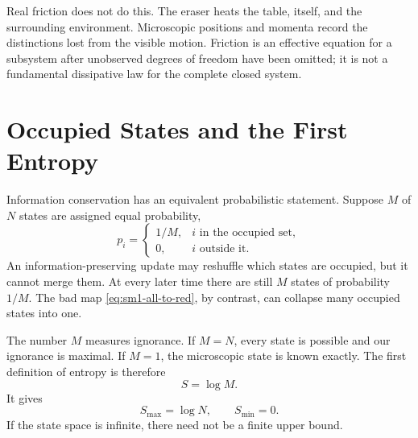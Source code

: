 Real friction does not do this. The eraser heats the table, itself, and the
surrounding environment. Microscopic positions and momenta record the
distinctions lost from the visible motion. Friction is an effective equation
for a subsystem after unobserved degrees of freedom have been omitted; it is
not a fundamental dissipative law for the complete closed system.

\begin{classroomqa}
\end{classroomqa}

\section{Occupied States and the First Entropy}

Information conservation has an equivalent probabilistic statement. Suppose
\(M\) of \(N\) states are assigned equal probability,
\begin{equation}
 p_i=
 \begin{cases}
 1/M, & i\text{ in the occupied set},\\
 0, & i\text{ outside it}.
 \end{cases}
 \label{eq:sm1-uniform-occupied}
\end{equation}
An information-preserving update may reshuffle which states are occupied,
but it cannot merge them. At every later time there are still \(M\) states of
probability \(1/M\). The bad map \eqref{eq:sm1-all-to-red}, by contrast,
can collapse many occupied states into one.

The number \(M\) measures ignorance. If \(M=N\), every state is possible and
our ignorance is maximal. If \(M=1\), the microscopic state is known exactly.
The first definition of entropy is therefore
\begin{equation}
 S=\log M.
 \label{eq:sm1-entropy-logm}
\end{equation}
It gives
\begin{equation}
 S_{\max}=\log N,
 \qquad
 S_{\min}=0.
\end{equation}
If the state space is infinite, there need not be a finite upper bound.

